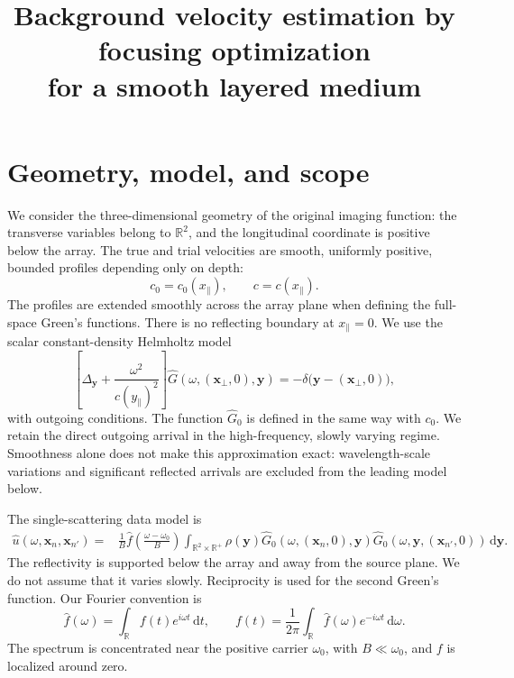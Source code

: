 \documentclass[11pt]{article}
\title{Background velocity estimation by focusing optimization\\
for a smooth layered medium}
\author{}
\date{}
\newcommand{\R}{\mathbb{R}}
\newcommand{\bx}{\bm{x}}
\newcommand{\by}{\bm{y}}
\newcommand{\dd}{\,\mathrm{d}}
\begin{document}
\maketitle

\section{Geometry, model, and scope}

We consider the three-dimensional geometry of the original imaging
function: the transverse variables belong to $\R^2$, and the longitudinal
coordinate is positive below the array. The true and trial velocities are
smooth, uniformly positive, bounded profiles depending only on depth:
\begin{equation}
c_0=c_0(x_\parallel),\qquad c=c(x_\parallel).
\label{eq:profiles}
\end{equation}
The profiles are extended smoothly across the array plane when defining
the full-space Green's functions. There is no reflecting boundary at
$x_\parallel=0$. We use the scalar constant-density Helmholtz model
\begin{equation}
\left[\Delta_{\by}+\frac{\omega^2}{c(y_\parallel)^2}\right]
\widehat G(\omega,(\bx_\perp,0),\by)
=-\delta\big(\by-(\bx_\perp,0)\big),
\label{eq:helmholtz}
\end{equation}
with outgoing conditions. The function $\widehat G_0$ is defined in the
same way with $c_0$. We retain the direct outgoing arrival in the
high-frequency, slowly varying regime. Smoothness alone does not make
this approximation exact: wavelength-scale variations and significant
reflected arrivals are excluded from the leading model below.

The single-scattering data model is
\begin{align}
\widehat u(\omega,\bx_n,\bx_{n'})
={}&\frac{1}{B}\widehat f\!\left(\frac{\omega-\omega_0}{B}\right)
\int_{\R^2\times\R^+}\rho(\by)
\widehat G_0(\omega,(\bx_n,0),\by)
\widehat G_0(\omega,\by,(\bx_{n'},0))\dd\by.
\label{eq:data}
\end{align}
The reflectivity is supported below the array and away from the source
plane. We do not assume that it varies slowly. Reciprocity is used for
the second Green's function. Our Fourier convention is
\begin{equation}
\widehat f(\omega)=\int_\R f(t)e^{i\omega t}\dd t,
\qquad
f(t)=\frac{1}{2\pi}\int_\R\widehat f(\omega)e^{-i\omega t}\dd\omega.
\label{eq:fourier}
\end{equation}
The spectrum is concentrated near the positive carrier $\omega_0$, with
$B\ll\omega_0$, and $f$ is localized around zero.
\end{document}

